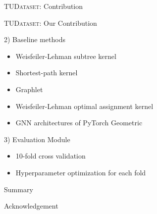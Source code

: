 \documentclass[utf8, xcolor=dvipsnames,ngerman]{beamer}
\begin{document}
\begin{frame}{\textsc{TUDataset}: Contribution}



\end{frame}


\begin{frame}{\textsc{TUDataset}: Our Contribution}

\begin{block}{2) Baseline methods}
 \begin{itemize}
  \item Weisfeiler-Lehman subtree kernel 
  \item Shortest-path kernel 
  \item Graphlet  
  \item Weisfeiler-Lehman optimal assignment kernel 
  \item GNN architectures of PyTorch Geometric
 \end{itemize}
\end{block}

\begin{block}{3) Evaluation Module}
 \begin{itemize}
  \item 10-fold cross validation
  \item Hyperparameter optimization for each fold
 \end{itemize}
\end{block}
 
\end{frame}


\begin{frame}{Summary}


\begin{block}{Acknowledgement}
 
\end{block}



\end{frame}
\end{document}
